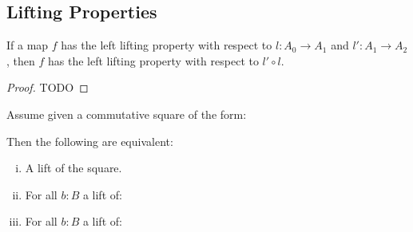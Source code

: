 \subsection{Lifting Properties}

\begin{lemma}%
  If a map $f$ has the left lifting property with respect to $l:A_0\to A_1$ and $l':A_1\to A_2$,
  then $f$ has the left lifting property with respect to $l'\circ l$.
\end{lemma}

\begin{proof}
  TODO
\end{proof}

\begin{lemma}
\label{lifts-equivalence-pointwise}
Assume given a commutative square of the form:
 \begin{center}
  \end{center}
Then the following are equivalent:
\begin{enumerate}[(i)]
\item A lift of the square.
\item For all $b:B$ a lift of:
 \begin{center}
  \end{center}
 \item For all $b:B$ a lift of:
  \begin{center}
  \end{center}
\end{enumerate}
\end{lemma}

